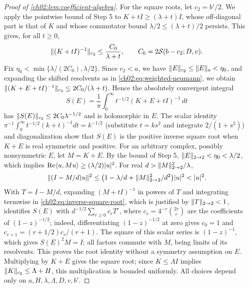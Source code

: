 \begin{proof}[Proof of \cref{ch02:lem:coefficient-algebra}]
For the square roots, let $c_2=b'/2$. We apply the pointwise bound of Step 5 to $K+tI\ge(\lambda+t)I$, whose off-diagonal part is that of $K$ and whose commutator bound $\lambda/2\le(\lambda+t)/2$ persists. This gives, for all $t\ge0$,
\begin{equation}\label{ch02:eq:shifted-inverse}
 \lVert (K+tI)^{-1}\rVert_{c_2}\le\frac{C_0}{\lambda+t},\qquad C_0=2\mathcal S(b-c_2;D,v).
\end{equation}
Fix $\eta_0<\min\{\lambda/(2C_0),\lambda/2\}$. Since $c_2<a$, we have $\lVert E\rVert_{c_2}\le\lVert E\rVert_a<\eta_0$, and expanding the shifted resolvents as in \eqref{ch02:eq:weighted-neumann}, we obtain $\lVert (K+E+tI)^{-1}\rVert_{c_2}\le2C_0/(\lambda+t)$. Hence the absolutely convergent integral
\begin{equation}\label{ch02:eq:inverse-square-root}
 S(E)=\frac1\pi\int_0^\infty t^{-1/2}(K+E+tI)^{-1}\,dt
\end{equation}
has $\lVert S(E)\rVert_{c_2}\le2C_0\lambda^{-1/2}$ and is holomorphic in $E$. The scalar identity $\pi^{-1}\int_0^\infty t^{-1/2}(k+t)^{-1}dt=k^{-1/2}$ (substitute $t=ks^2$ and integrate $2/(1+s^2)$) and diagonalization show that $S(E)$ is the positive inverse square root when $K+E$ is real symmetric and positive. For an arbitrary complex, possibly nonsymmetric $E$, let $M=K+E$. By the bound of Step 5, $\lVert E\rVert_{2\to2}<\eta_0<\lambda/2$, which implies $\operatorname{Re}\langle u,Mu\rangle\ge(\lambda/2)\lvert u\rvert^2$. For real $d>\lVert M\rVert_{2\to2}^2/\lambda$,
\[
 \lVert (I-M/d)u\rVert^2\le\bigl(1-\lambda/d+\lVert M\rVert_{2\to2}^2/d^2\bigr)\lvert u\rvert^2<\lvert u\rvert^2.
\]
With $T=I-M/d$, expanding $(M+tI)^{-1}$ in powers of $T$ and integrating termwise in \eqref{ch02:eq:inverse-square-root}, which is justified by $\lVert T\rVert_{2\to2}<1$, identifies $S(E)$ with $d^{-1/2}\sum_{r\ge0}c_rT^r$, where $c_r=4^{-r}\binom{2r}r$ are the coefficients of $(1-z)^{-1/2}$; indeed, differentiating $(1-z)^{-1/2}$ at zero gives $c_0=1$ and $c_{r+1}=(r+1/2)c_r/(r+1)$. The square of this scalar series is $(1-z)^{-1}$, which gives $S(E)^2M=I$; all factors commute with $M$, being limits of its resolvents. This proves the root identity without a symmetry assumption on $E$. Multiplying by $K+E$ gives the square root; since $K\le\Lambda I$ implies $\lVert K\rVert_{c_2}\le\Lambda+H$, this multiplication is bounded uniformly. All choices depend only on $a,H,\lambda,\Lambda,D,v,b'$.


\end{proof}

